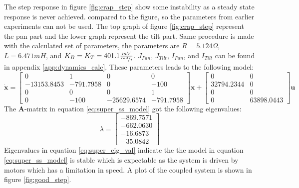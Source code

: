 The step response in figure \ref{fig:crap_step} show some instability as a steady state response is never achieved.  compared to the figure, so the parameters from earlier experiments can not be used. The top graph of figure \ref{fig:crap_step} represent the pan part and the lower graph represent the tilt part. Same procedure is made with the calculated set of parameters, the parameters are $R = 5.124\Omega$, $L = 6.471mH$, and $K_B = K_T = 401.1 \frac{mV}{\sfrac{rad}{s}}$. $J_{Pan}$, $J_{Tilt}$, $I_{Pan}$, and $I_{Tilt}$ can be found in appendix \ref{app:dynamics_calc}.
These parameters leads to the following model:
\begin{equation}
 \dot{\textbf{x}} =
 \begin{bmatrix}
   0 & 1 & 0 & 0\\
   - 13153.8453 & - 791.7958 & 0 & - 100\\
   0 & 0 & 0 & 1\\
   0 & - 100 & - 25629.6574 & - 791.7958
 \end{bmatrix}
 \textbf{x} +
 \begin{bmatrix}
   0 & 0\\
   32794.2344 & 0\\
   0 & 0\\
   0 & 63898.0443
 \end{bmatrix}
 \textbf{u}\label{eq:super_ss_model}
\end{equation}
The \textbf{A}-matrix in equation \ref{eq:super_ss_model} got the following eigenvalues:
\begin{equation}
 \lambda =
 \begin{bmatrix}
   - 869.7571\\
   - 662.0630\\
   - 16.6873\\
   - 35.0842
 \end{bmatrix}\label{eq:super_eig_val}
\end{equation}
Eigenvalues in equation \ref{eq:super_eig_val} indicate the the model in equation \ref{eq:super_ss_model} is stable which is expectable as the system is driven by motors which has a limitation in speed. A plot of the coupled system is shown in figure \ref{fig:good_step}.

